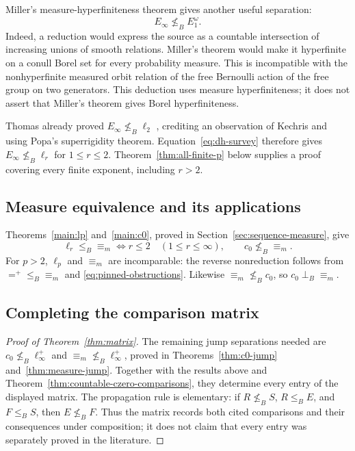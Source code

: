 \documentclass[11pt]{article}
\numberwithin{equation}{section}
\theoremstyle{definition}
\newcommand{\inc}{\mathrel{\perp_B}}
\begin{document}
Miller's measure-hyperfiniteness theorem
\cite[Theorem~4]{Miller} gives another useful separation:
\begin{equation}\label{eq:miller-separation}
 E_\infty\nleq_B E_1^\omega.
\end{equation}
Indeed, a reduction would express the source as a countable
intersection of increasing unions of smooth relations.  Miller's theorem
would make it hyperfinite on a conull Borel set for every probability
measure.  This is incompatible with the nonhyperfinite measured orbit
relation of the free Bernoulli action of the free group on two
generators.  This deduction uses measure hyperfiniteness; it does not
assert that Miller's theorem gives Borel hyperfiniteness.

Thomas already proved $E_\infty\nleq_B\ell_2$
\cite[Theorem~6.12]{Thomas}, crediting an observation of Kechris and
using Popa's superrigidity theorem.  Equation~\eqref{eq:dh-survey}
therefore gives $E_\infty\nleq_B\ell_r$ for $1\leq r\leq2$.
Theorem~\ref{thm:all-finite-p} below supplies a proof covering every
finite exponent, including $r>2$.

\subsection{Measure equivalence and its applications}

Theorems~\ref{main:lp} and~\ref{main:c0}, proved in
Section~\ref{sec:sequence-measure}, give
\begin{equation}\label{eq:wang-comparisons}
 \ell_r\leq_B{\equiv_m}\Longleftrightarrow r\leq2
 \quad(1\leq r\leq\infty),\qquad c_0\nleq_B{\equiv_m}.
\end{equation}
For $p>2$, $\ell_p$ and $\equiv_m$ are incomparable: the reverse
nonreduction follows from ${=^+}\leq_B{\equiv_m}$ and
\eqref{eq:pinned-obstructions}. Likewise $\equiv_m\nleq_B c_0$,
so $c_0\inc{\equiv_m}$.

\subsection{Completing the comparison matrix}

\begin{proof}[Proof of Theorem~\ref{thm:matrix}]
The remaining jump separations needed are
$c_0\nleq_B\ell_\infty^+$ and
${\equiv_m}\nleq_B\ell_\infty^+$, proved in
Theorems~\ref{thm:c0-jump} and~\ref{thm:measure-jump}.
Together with the results above and
Theorem~\ref{thm:countable-czero-comparisons}, they determine every
entry of the displayed matrix.  The propagation rule is elementary:
if $R\nleq_B S$, $R\leq_B E$, and $F\leq_B S$, then
$E\nleq_B F$.  Thus the matrix records both cited comparisons and
their consequences under composition; it does not claim that every
entry was separately proved in the literature.

\end{proof}
\end{document}
